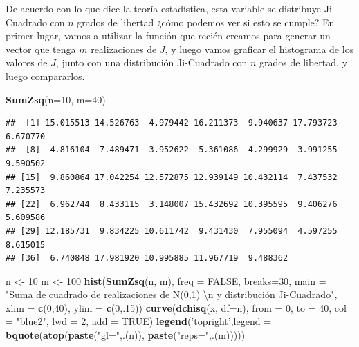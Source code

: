 \documentclass[]{article}
\newenvironment{Shaded}{\begin{snugshade}}{\end{snugshade}}
\newcommand{\CharTok}[1]{\textcolor[rgb]{0.31,0.60,0.02}{#1}}
\newcommand{\DataTypeTok}[1]{\textcolor[rgb]{0.13,0.29,0.53}{#1}}
\newcommand{\DecValTok}[1]{\textcolor[rgb]{0.00,0.00,0.81}{#1}}
\newcommand{\KeywordTok}[1]{\textcolor[rgb]{0.13,0.29,0.53}{\textbf{#1}}}
\newcommand{\NormalTok}[1]{#1}
\newcommand{\OtherTok}[1]{\textcolor[rgb]{0.56,0.35,0.01}{#1}}
\newcommand{\StringTok}[1]{\textcolor[rgb]{0.31,0.60,0.02}{#1}}
\begin{document}
De acuerdo con lo que dice la teoría estadística, esta variable se
distribuye Ji-Cuadrado con \(n\) grados de libertad ¿cómo podemos ver si
esto se cumple? En primer lugar, vamos a utilizar la función que recién
creamos para generar un vector que tenga \(m\) realizaciones de \(J\), y
luego vamos graficar el histograma de los valores de \(J\), junto con
una distribución Ji-Cuadrado con \(n\) grados de libertad, y luego
compararlos.

\begin{Shaded}
\begin{Highlighting}[]
\KeywordTok{SumZsq}\NormalTok{(}\DataTypeTok{n=}\DecValTok{10}\NormalTok{, }\DataTypeTok{m=}\DecValTok{40}\NormalTok{)}
\end{Highlighting}
\end{Shaded}

\begin{verbatim}
##  [1] 15.015513 14.526763  4.979442 16.211373  9.940637 17.793723  6.670770
##  [8]  4.816104  7.489471  3.952622  5.361086  4.299929  3.991255  9.590502
## [15]  9.860864 17.042254 12.572875 12.939149 10.432114  7.437532  7.235573
## [22]  6.962744  8.433115  3.148007 15.432692 10.395595  9.406276  5.609586
## [29] 12.185731  9.834225 10.611742  9.431430  7.955094  4.597255  8.615015
## [36]  6.740848 17.981920 10.995885 11.967719  9.488362
\end{verbatim}

\begin{Shaded}
\begin{Highlighting}[]
\NormalTok{n <-}\StringTok{ }\DecValTok{10} 
\NormalTok{m <-}\StringTok{ }\DecValTok{100}
\KeywordTok{hist}\NormalTok{(}\KeywordTok{SumZsq}\NormalTok{(n, m), }\DataTypeTok{freq =} \OtherTok{FALSE}\NormalTok{, }\DataTypeTok{breaks=}\DecValTok{30}\NormalTok{,}
     \DataTypeTok{main =} \StringTok{"Suma de cuadrado de realizaciones de N(0,1) }\CharTok{\textbackslash{}n}\StringTok{ y distribución Ji-Cuadrado"}\NormalTok{,}
     \DataTypeTok{xlim =} \KeywordTok{c}\NormalTok{(}\DecValTok{0}\NormalTok{,}\DecValTok{40}\NormalTok{), }\DataTypeTok{ylim =} \KeywordTok{c}\NormalTok{(}\DecValTok{0}\NormalTok{,.}\DecValTok{15}\NormalTok{))}
\KeywordTok{curve}\NormalTok{(}\KeywordTok{dchisq}\NormalTok{(x, }\DataTypeTok{df=}\NormalTok{n),}
      \DataTypeTok{from =} \DecValTok{0}\NormalTok{, }\DataTypeTok{to =} \DecValTok{40}\NormalTok{,}
      \DataTypeTok{col  =} \StringTok{"blue2"}\NormalTok{,}
      \DataTypeTok{lwd  =} \DecValTok{2}\NormalTok{,}
      \DataTypeTok{add  =} \OtherTok{TRUE}\NormalTok{)}
\KeywordTok{legend}\NormalTok{(}\StringTok{'topright'}\NormalTok{,}\DataTypeTok{legend =}  \KeywordTok{bquote}\NormalTok{(}\KeywordTok{atop}\NormalTok{(}\KeywordTok{paste}\NormalTok{(}\StringTok{"gl="}\NormalTok{,.(n)), }\KeywordTok{paste}\NormalTok{(}\StringTok{"reps="}\NormalTok{,.(m)))))}
\end{Highlighting}
\end{Shaded}
\end{document}
